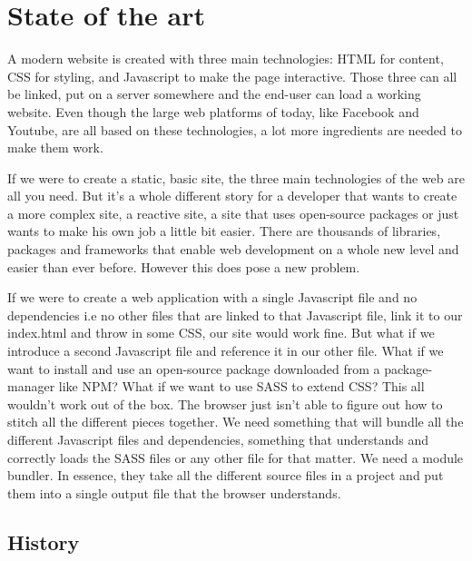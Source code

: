 \chapter{State of the art}
\label{ch:stand-van-zaken}



A modern website is created with three main technologies: HTML for content, CSS for styling, and Javascript to make the page interactive. Those three can all be linked, put on a server somewhere and the end-user can load a working website. Even though the large web platforms of today, like Facebook and Youtube, are all based on these technologies, a lot more ingredients are needed to make them work.

If we were to create a static, basic site, the three main technologies of the web are all you need. But it’s a whole different story for a developer that wants to create a more complex site, a reactive site, a site that uses open-source packages or just wants to make his own job a little bit easier. There are thousands of libraries, packages and frameworks that enable web development on a whole new level and easier than ever before. However this does pose a new problem. 

If we were to create a web application with a single Javascript file and no dependencies i.e no other files that are linked to that Javascript file, link it to our index.html and throw in some CSS, our site would work fine. But what if we introduce a second Javascript file and reference it in our other file. What if we want to install and use an open-source package downloaded from a package-manager like NPM? What if we want to use SASS to extend CSS? This all wouldn’t work out of the box. The browser just isn’t able to figure out how to stitch all the different pieces together.
We need something that will bundle all the different Javascript files and dependencies, something that understands and correctly loads the SASS files or any other file for that matter. We need a module bundler. In essence, they take all the different source files in a project and put them into a single output file that the browser understands. 

\section{History}

